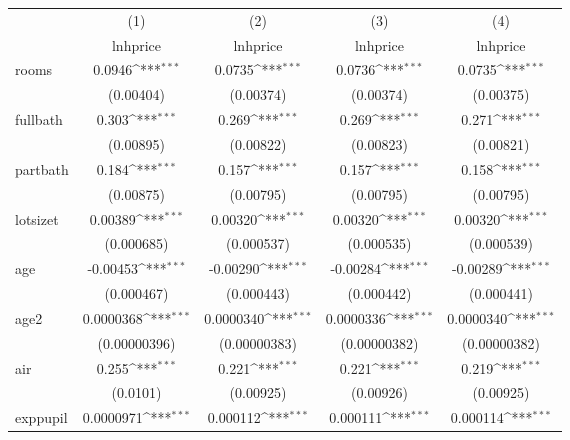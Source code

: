 {
\def\sym#1{\ifmmode^{#1}\else\(^{#1}\)\fi}
\begin{tabular}{l*{4}{c}}
\hline\hline
            &\multicolumn{1}{c}{(1)}&\multicolumn{1}{c}{(2)}&\multicolumn{1}{c}{(3)}&\multicolumn{1}{c}{(4)}\\
            &\multicolumn{1}{c}{lnhprice}&\multicolumn{1}{c}{lnhprice}&\multicolumn{1}{c}{lnhprice}&\multicolumn{1}{c}{lnhprice}\\
\hline
rooms       &      0.0946\sym{***}&      0.0735\sym{***}&      0.0736\sym{***}&      0.0735\sym{***}\\
            &   (0.00404)         &   (0.00374)         &   (0.00374)         &   (0.00375)         \\
[1em]
fullbath    &       0.303\sym{***}&       0.269\sym{***}&       0.269\sym{***}&       0.271\sym{***}\\
            &   (0.00895)         &   (0.00822)         &   (0.00823)         &   (0.00821)         \\
[1em]
partbath    &       0.184\sym{***}&       0.157\sym{***}&       0.157\sym{***}&       0.158\sym{***}\\
            &   (0.00875)         &   (0.00795)         &   (0.00795)         &   (0.00795)         \\
[1em]
lotsizet    &     0.00389\sym{***}&     0.00320\sym{***}&     0.00320\sym{***}&     0.00320\sym{***}\\
            &  (0.000685)         &  (0.000537)         &  (0.000535)         &  (0.000539)         \\
[1em]
age         &    -0.00453\sym{***}&    -0.00290\sym{***}&    -0.00284\sym{***}&    -0.00289\sym{***}\\
            &  (0.000467)         &  (0.000443)         &  (0.000442)         &  (0.000441)         \\
[1em]
age2        &   0.0000368\sym{***}&   0.0000340\sym{***}&   0.0000336\sym{***}&   0.0000340\sym{***}\\
            &(0.00000396)         &(0.00000383)         &(0.00000382)         &(0.00000382)         \\
[1em]
air         &       0.255\sym{***}&       0.221\sym{***}&       0.221\sym{***}&       0.219\sym{***}\\
            &    (0.0101)         &   (0.00925)         &   (0.00926)         &   (0.00925)         \\
[1em]
exppupil    &   0.0000971\sym{***}&    0.000112\sym{***}&    0.000111\sym{***}&    0.000114\sym{***}\\

\end{tabular}}

